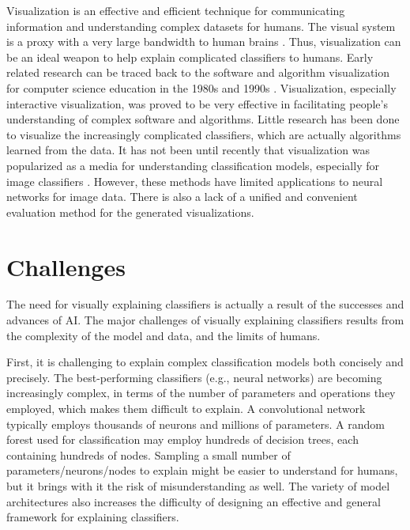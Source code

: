 Visualization is an effective and efficient technique for communicating information and understanding complex datasets for humans. The visual system is a proxy with a very large bandwidth to human brains \cite{munzner2014visualization}. Thus, visualization can be an ideal weapon to help explain complicated classifiers to humans. Early related research can be traced back to the software and algorithm visualization for computer science education in the 1980s and 1990s \cite{brown1987aa,stasko1990aa,price1992taxonomy}. Visualization, especially interactive visualization, was proved to be very effective in facilitating people's understanding of complex software and algorithms.
Little research has been done to visualize the increasingly complicated classifiers, which are actually algorithms learned from the data. It has not been until recently that visualization was popularized as a media for understanding classification models, especially for image classifiers \cite{simonyan14saliency,zeiler2014eccv,bach15plos,zintgraf17visualize}. However, these methods have limited applications to neural networks for image data. There is also a lack of a unified and convenient evaluation method for the generated visualizations.

\section{Challenges}

The need for visually explaining classifiers is actually a result of the successes and advances of AI. The major challenges of visually explaining classifiers results from the complexity of the model and data, and the limits of humans.

First, it is challenging to explain complex classification models both concisely and precisely. The best-performing classifiers (e.g., neural networks) are becoming increasingly complex, in terms of the number of parameters and operations they employed, which makes them difficult to explain. A convolutional network typically employs thousands of neurons and millions of parameters. A random forest used for classification may employ hundreds of decision trees, each containing hundreds of nodes. Sampling a small number of parameters/neurons/nodes to explain might be easier to understand for humans, but it brings with it the risk of misunderstanding as well. The variety of model architectures also increases the difficulty of designing an effective and general framework for explaining classifiers.

